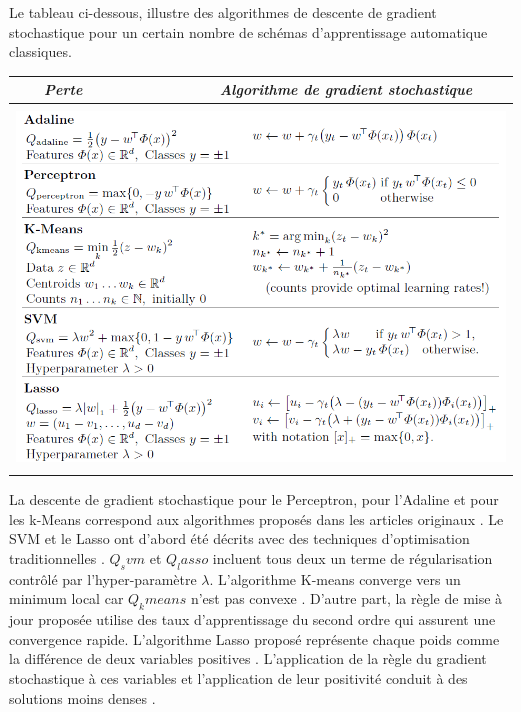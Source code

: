 	Le tableau ci-dessous, illustre des algorithmes de descente de gradient stochastique pour un certain nombre de schémas d'apprentissage automatique classiques. 
	
	\begin{tabular}{lr}
		\hline
		\textbf{\textsl{$\qquad$Perte}} & \textbf{\textsl{Algorithme de gradient stochastique $\qquad$ }} \\
		\hline
		& \\
		\multicolumn{2}{c}{\includegraphics[width=\textwidth]{images/sg_algo_learning _systems}}\\
		& \\
		\hline
	\end{tabular}
	
	La descente de gradient stochastique pour le Perceptron, pour l'Adaline et pour les k-Means correspond aux algorithmes proposés dans les articles originaux \cite{bottou2012stochastic}. Le SVM et le Lasso ont d'abord été décrits avec des techniques d'optimisation traditionnelles \cite{bottou2018optimization}. $Q_svm$ et $Q_lasso$ incluent tous deux un terme de régularisation contrôlé par l'hyper-paramètre $\lambda$. L'algorithme K-means converge vers un minimum local car $Q_kmeans$ n'est pas convexe \cite{bottou2012stochastic}. D'autre part, la règle de mise à jour proposée utilise des taux d'apprentissage du second ordre qui assurent une convergence rapide. L'algorithme Lasso proposé représente chaque poids comme la différence de deux variables positives \cite{bottou2010large}. L'application de la règle du gradient stochastique à ces variables et l'application de leur positivité conduit à des solutions moins denses \cite{bottou2012stochastic}.
	
